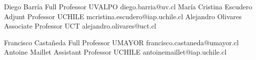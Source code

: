 





\begin{referees}
		{Diego Barría}
		{Full Professor}
		{UVALPO}
		{diego.barria@uv.cl}
		{María Cristina Escudero}
		{Adjunt Professor}
		{UCHILE}
		{mcristina.escudero@iap.uchile.cl}
		{Alejandro Olivares}
		{Associate Professor}
		{UCT}
		{alejandro.olivares@uct.cl}
\end{referees}

\begin{referees}
		{Francisco Castañeda}
		{Full Professor}
		{UMAYOR}
		{francisco.castaneda@umayor.cl}
		{Antoine Maillet}
		{Assistant Professor}
		{UCHILE}
		{antoinemaillet@iap.uchile.cl}
\end{referees}

